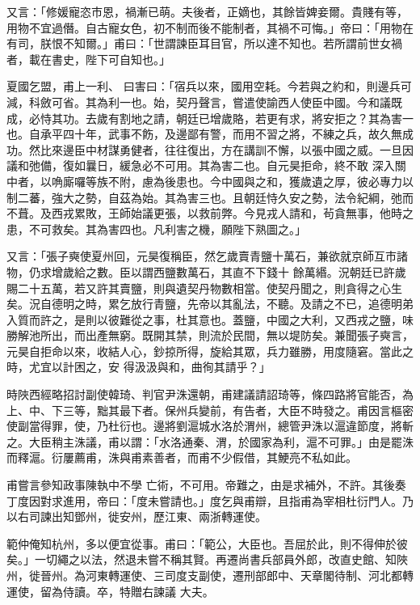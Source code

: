 \begin{pinyinscope}
 又言：「修媛寵恣市恩，禍漸已萌。夫後者，正嫡也，其餘皆婢妾爾。貴賤有等，用物不宜過僭。自古寵女色，初不制而後不能制者，其禍不可悔。」帝曰：「用物在有司，朕恨不知爾。」甫曰：「世謂諫臣耳目官，所以達不知也。若所謂前世女禍者，載在書史，陛下可自知也。」



 夏國乞盟，甫上一利、
 曰害曰：「宿兵以來，國用空耗。今若與之約和，則邊兵可減，科斂可省。其為利一也。始，契丹聲言，嘗遣使諭西人使臣中國。今和議既成，必恃其功。去歲有割地之請，朝廷已增歲賂，若更有求，將安拒之？其為害一也。自承平四十年，武事不飭，及邊鄙有警，而用不習之將，不練之兵，故久無成功。然比來邊臣中材謀勇健者，往往復出，方在講訓不懈，以張中國之威。一旦因議和弛備，復如曩日，緩急必不可用。其為害二也。自元昊拒命，終不敢
 深入關中者，以唃廝囉等族不附，慮為後患也。今中國與之和，獲歲遺之厚，彼必專力以制二蕃，強大之勢，自茲為始。其為害三也。且朝廷恃久安之勢，法令紀綱，弛而不葺。及西戎累敗，王師始議更張，以救前弊。今見戎人請和，茍貪無事，他時之患，不可救矣。其為害四也。凡利害之機，願陛下熟圖之。」



 又言：「張子奭使夏州回，元昊復稱臣，然乞歲賣青鹽十萬石，兼欲就京師互市諸物，仍求增歲給之數。臣以謂西鹽數萬石，其直不下錢十
 餘萬緡。況朝廷已許歲賜二十五萬，若又許其賣鹽，則與遺契丹物數相當。使契丹聞之，則貪得之心生矣。況自德明之時，累乞放行青鹽，先帝以其亂法，不聽。及請之不已，追德明弟入質而許之，是則以彼難從之事，杜其意也。蓋鹽，中國之大利，又西戎之鹽，味勝解池所出，而出產無窮。既開其禁，則流於民間，無以堤防矣。兼聞張子奭言，元昊自拒命以來，收結人心，鈔掠所得，旋給其眾，兵力雖勝，用度隨窘。當此之時，尤宜以計困之，安
 得汲汲與和，曲徇其請乎？」



 時陜西經略招討副使韓琦、判官尹洙還朝，甫建議請詔琦等，條四路將官能否，為上、中、下三等，黜其最下者。保州兵變前，有告者，大臣不時發之。甫因言樞密使副當得罪，使，乃杜衍也。邊將劉滬城水洛於渭州，總管尹洙以滬違節度，將斬之。大臣稍主洙議，甫以謂：「水洛通秦、渭，於國家為利，滬不可罪。」由是罷洙而釋滬。衍屢薦甫，洙與甫素善者，而甫不少假借，其鯁亮不私如此。



 甫嘗言參知政事陳執中不學
 亡術，不可用。帝難之，由是求補外，不許。其後奏丁度因對求進用，帝曰：「度未嘗請也。」度乞與甫辯，且指甫為宰相杜衍門人。乃以右司諫出知鄧州，徙安州，歷江東、兩浙轉運使。



 範仲俺知杭州，多以便宜從事。甫曰：「範公，大臣也。吾屈於此，則不得伸於彼矣。」一切繩之以法，然退未嘗不稱其賢。再遷尚書兵部員外郎，改直史館、知陜州，徙晉州。為河東轉運使、三司度支副使，遷刑部郎中、天章閣待制、河北都轉運使，留為侍讀。卒，特贈右諫議
 大夫。




\end{pinyinscope}
